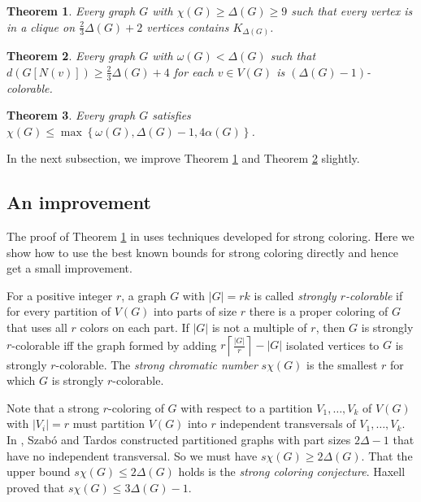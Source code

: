 \documentclass[12pt]{article}
\theoremstyle{plain}
\newtheorem{thm}{Theorem}
\theoremstyle{definition}
\theoremstyle{remark}
\newcommand{\set}[1]{\left\{ #1 \right\}}
\newcommand{\card}[1]{\left|#1\right|}
\newcommand{\ceil}[1]{\left\lceil#1\right\rceil}
\begin{document}
\begin{thm}\label{TwoThirdsCliqueCor}
Every graph $G$ with $\chi(G) \geq \Delta(G) \geq 9$ such that every
vertex is in a clique on $\frac23\Delta(G) + 2$ vertices contains $K_{\Delta(G)}$.
\end{thm}

\begin{thm}\label{BKdense}
Every graph $G$ with $\omega(G) < \Delta(G)$ such that $d(G[N(v)]) \geq \frac23\Delta(G) + 4$ for each $v \in V(G)$ is $(\Delta(G)-1)$-colorable.
\end{thm}

\begin{thm}
Every graph $G$ satisfies $\chi(G) \le \max\set{\omega(G), \Delta(G) - 1, 4\alpha(G)}$.
\end{thm}

In the next subsection, we improve Theorem \ref{TwoThirdsCliqueCor} and Theorem \ref{BKdense} slightly.

\subsection{An improvement}
The proof of Theorem \ref{TwoThirdsCliqueCor} in \cite{denseneighborhoods} uses techniques developed for strong coloring.  
Here we show how to use the best known bounds for strong coloring directly and hence get a small improvement.

For a positive integer $r$, a graph $G$ with $\card{G} = rk$ is called \emph{strongly $r$-colorable} if for every partition 
of $V(G)$ into parts of size $r$ there is a proper coloring of $G$ that uses all $r$ colors on each part.  
If $\card{G}$ is not a multiple of $r$, then $G$ is strongly $r$-colorable iff the graph formed by adding $r\ceil{\frac{|G|}{r}} - |G|$ isolated vertices to $G$ is strongly $r$-colorable.  
The \emph{strong chromatic number} $s\chi(G)$ is the smallest $r$ for which $G$ is strongly $r$-colorable.

Note that a strong $r$-coloring of $G$ with respect to a partition $V_1, \ldots, V_k$ of $V(G)$ with $\card{V_i} = r$ must partition $V(G)$ into $r$ 
independent transversals of $V_1, \ldots, V_k$. In \cite{szabo2006extremal}, Szab{\'o} and Tardos constructed partitioned graphs with part sizes $2\Delta - 1$ 
that have no independent transversal.  So we must have $s\chi(G) \geq 2\Delta(G)$.  That the upper bound $s\chi(G) \le 2\Delta(G)$ holds is the \emph{strong coloring conjecture}.
Haxell \cite{haxell2004strong} proved that $s\chi(G) \leq 3\Delta(G) - 1$.  
\end{document}
